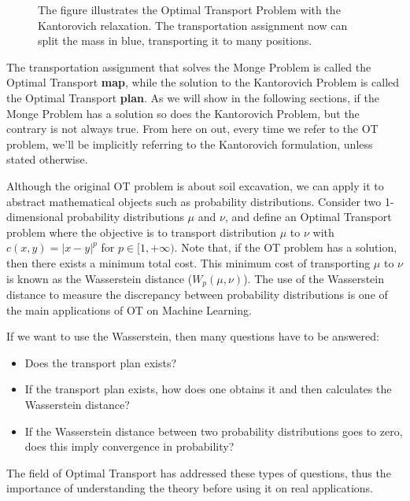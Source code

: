 \begin{figure}[H]
  \centering
  \def\svgscale{0.7}
  
  \caption{The figure illustrates the Optimal Transport Problem with the Kantorovich relaxation.
  The transportation assignment now can split the mass in blue, transporting it to many positions.}
  \label{fig:kantorovichproblem}
\end{figure}

The transportation assignment that solves the Monge Problem is called the Optimal Transport \textbf{map},
while the solution to the Kantorovich Problem is called the Optimal Transport \textbf{plan}. As we will show
in the following sections, if the Monge Problem has a solution so does the Kantorovich Problem,
but the contrary is not always true. From here
on out, every time we refer to the OT problem, we'll be implicitly referring to the Kantorovich formulation, unless
stated otherwise.

Although the original OT problem is about soil excavation, we can apply it to abstract mathematical objects
such as probability distributions. Consider two 1-dimensional probability distributions
$\mu$ and $\nu$, and define an Optimal Transport problem where the objective is to transport
distribution $\mu$ to $\nu$ with $c(x,y) = |x-y|^p$ for $p \in [1,+\infty)$.
Note that, if the OT problem has a solution, then there exists a minimum total cost. This minimum
cost of transporting $\mu$ to $\nu$ is known as the Wasserstein distance ($W_p(\mu,\nu)$).
The use of the Wasserstein distance to measure the discrepancy between probability distributions
is one of the main applications of OT on Machine Learning.

If we want to use the Wasserstein, then many questions have to be answered:
\begin{itemize}
  \item Does the transport plan exists?
  \item If the transport plan exists, how does one obtains it and then calculates the Wasserstein distance?
  \item If the Wasserstein distance between two probability distributions goes to zero,
  does this imply convergence in probability?
\end{itemize}

The field of Optimal Transport has addressed these types of questions, thus the importance of understanding
the theory before using it on real applications.


